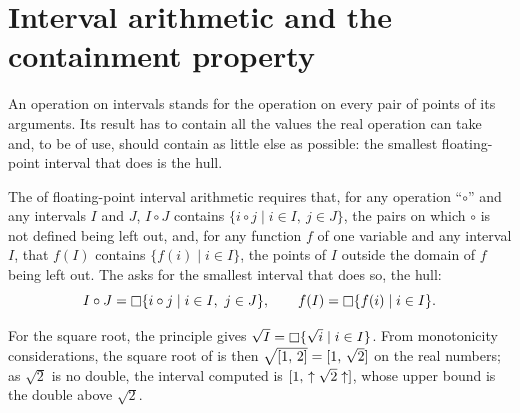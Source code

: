 \documentclass[12pt,a4paper,twoside,openright]{book}
\begin{document}
\section{Interval arithmetic and the containment property}
\label{sec:containment}
%
%

An operation on intervals stands for the operation on every pair of points
of its arguments. Its result has to contain all the values the real
operation can take and, to be of use, should contain as little else as
possible: the smallest floating-point interval that does is the hull.

\begin{Def}\label{def:containment}
The  of floating-point interval arithmetic
requires that, for any operation ``$\circ$'' and any intervals $I$ and $J$,
$I\circ J$ contains $\{i\circ j\mid i\in I,\ j\in J\}$, the pairs on which
$\circ$ is not defined being left out, and, for any function $f$ of one
variable and any interval $I$, that $f(I)$ contains $\{f(i)\mid i\in I\}$,
the points of $I$ outside the domain of $f$ being left out. The
 asks for the smallest interval that does so, the
hull:
\begin{equation*}
  I\circ J=\mathop{\Box} \{i\circ j\mid i\in I,\ j\in J\},\qquad
  f(I)=\mathop{\Box} \{f(i)\mid i\in I\}.
\end{equation*}
\end{Def}

\begin{Ex}\label{ex:sqrt-functional}
For the square root, the principle gives
$\sqrt{I}=\mathop{\Box} \{\sqrt{i}\mid i\in I\}$. From monotonicity
considerations, the square root of  is then
$\sqrt{[1,\,2]}=[1,\,\sqrt{2}]$ on the real numbers; as $\sqrt2$ is
no double, the interval computed is $[1,\,\uparrow\sqrt{2}\uparrow]$, whose
upper bound is the double above $\sqrt2$.
\end{Ex}
\end{document}
